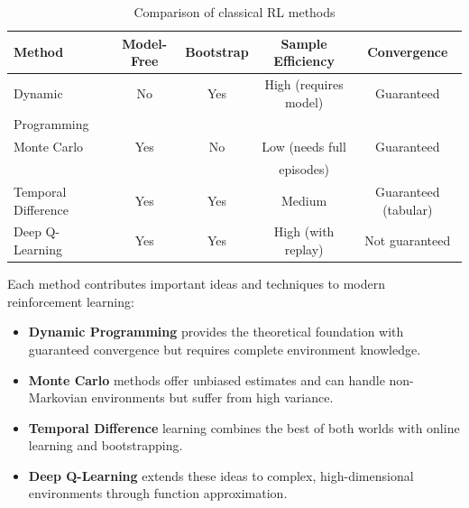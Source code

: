 \documentclass[../Main.tex]{subfiles}
\begin{document}
\begin{table}[h]
\centering
\begin{tabular}{|l|c|c|c|c|}
\hline
\textbf{Method} & \textbf{Model-Free} & \textbf{Bootstrap} & \textbf{Sample Efficiency} & \textbf{Convergence} \\
\hline
Dynamic & No & Yes & High (requires model) & Guaranteed \\
Programming & & & &  \\
\hline
Monte Carlo & Yes & No & Low (needs full& Guaranteed \\
& & &    episodes) & \\
\hline
Temporal Difference & Yes & Yes & Medium & Guaranteed (tabular) \\
\hline
Deep Q-Learning & Yes & Yes & High (with replay) & Not guaranteed \\
\hline
\end{tabular}
\caption{Comparison of classical RL methods}
\end{table}


Each method contributes important ideas and techniques to modern reinforcement learning:

\begin{itemize}
    \item \textbf{Dynamic Programming} provides the theoretical foundation with guaranteed convergence but requires complete environment knowledge.
    \item \textbf{Monte Carlo} methods offer unbiased estimates and can handle non-Markovian environments but suffer from high variance.
    \item \textbf{Temporal Difference} learning combines the best of both worlds with online learning and bootstrapping.
    \item \textbf{Deep Q-Learning} extends these ideas to complex, high-dimensional environments through function approximation.
\end{itemize}

\biblio %
\end{document}
